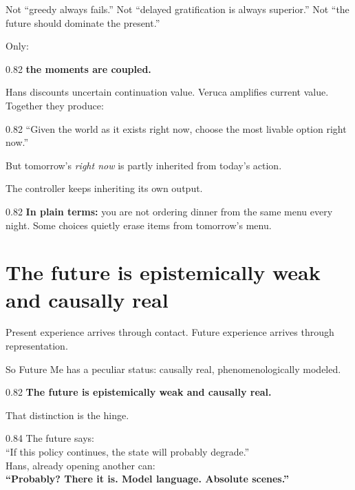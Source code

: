 \documentclass[10pt,letterpaper]{article}
\newenvironment{paperbody}
  {\begingroup\justifying}
  {\par\endgroup}
\newenvironment{voicebox}
  {\Needspace{3.5\baselineskip}\par\vspace{0.22em}\begin{center}\begingroup
   \begin{lrbox}{\voiceboxsave}\begin{varwidth}{0.82\linewidth}
   \small\rmfamily\upshape\RaggedRight}
  {\end{varwidth}\end{lrbox}\fbox{\usebox{\voiceboxsave}}
   \endgroup\end{center}\vspace{0.22em}}
\newenvironment{dialoguebox}
  {\Needspace{5\baselineskip}\par\vspace{0.26em}\begin{center}\begingroup
   \begin{lrbox}{\dialogueboxsave}\begin{varwidth}{0.84\linewidth}
   \small\rmfamily\upshape\RaggedRight}
  {\end{varwidth}\end{lrbox}\fbox{\usebox{\dialogueboxsave}}
   \endgroup\end{center}\vspace{0.26em}}
\newenvironment{thesisbox}
  {\Needspace{3.5\baselineskip}\par\vspace{0.32em}\begin{center}\begingroup
   \begin{lrbox}{\thesisboxsave}\begin{varwidth}{0.82\linewidth}
   \normalsize\rmfamily\bfseries\upshape\RaggedRight}
  {\end{varwidth}\end{lrbox}\fbox{\usebox{\thesisboxsave}}
   \endgroup\end{center}\vspace{0.32em}}
\newenvironment{plainbox}
  {\Needspace{3.5\baselineskip}\par\vspace{0.24em}\begin{center}\begingroup
   \begin{lrbox}{\plainboxsave}\begin{varwidth}{0.82\linewidth}
   \small\rmfamily\upshape\RaggedRight}
  {\end{varwidth}\end{lrbox}\fbox{\usebox{\plainboxsave}}
   \endgroup\end{center}\vspace{0.24em}}
\let\oldsection\section
\renewcommand{\section}{\Needspace{6\baselineskip}\oldsection}
\begin{document}
\begin{paperbody}
Not ``greedy always fails.'' Not ``delayed gratification is always
superior.'' Not ``the future should dominate the present.''

Only:

\begin{voicebox}
\textbf{the moments are coupled.}
\end{voicebox}

Hans discounts uncertain continuation value. Veruca amplifies current
value. Together they produce:

\begin{voicebox}
``Given the world as it exists right now, choose the most livable option
right now.''
\end{voicebox}

But tomorrow's \emph{right now} is partly inherited from today's action.

The controller keeps inheriting its own output.

\begin{plainbox}
\textbf{In plain terms:} you are not ordering dinner from the same menu
every night. Some choices quietly erase items from tomorrow's menu.
\end{plainbox}

\section{The future is epistemically weak and causally
real}\label{the-future-is-epistemically-weak-and-causally-real}

Present experience arrives through contact. Future experience arrives
through representation.

So Future Me has a peculiar status: causally real, phenomenologically
modeled.

\begin{thesisbox}
The future is epistemically weak and causally real.
\end{thesisbox}

That distinction is the hinge.

\begin{dialoguebox}
The future says:\\
``If this policy continues, the state will probably degrade.''\\[0.35em]
Hans, already opening another can:\\
\textbf{``Probably? There it is. Model language. Absolute scenes.''}
\end{dialoguebox}


\end{paperbody}
\end{document}
